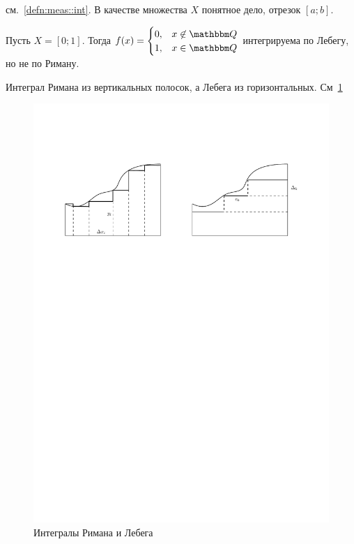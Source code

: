 \documentclass[draft, timbord]{longnotes}
\begin{document}
\begin{defn}\label{defn:meas::rimleb::leb}
  см.~\ref{defn:meas::int}. В качестве множества $X$ понятное дело, отрезок $[a;b]$.
\end{defn}

\begin{exmp}\label{exmp:meas::rimleb::notrim}
  Пусть $X=[0;1]$. Тогда $f(x) = \begin{cases}
    0, & x\not\in \Q \\
    1, & x\in \Q 
  \end{cases}$ интегрируема по Лебегу, но не по Риману.
\end{exmp}

Интеграл Римана из вертикальных полосок, а Лебега из горизонтальных.
См~\ref{fig:meas::rimleb} 

\begin{figure}
\begin{center}
  \includegraphics[scale=1]{meas/lebegriman}
\end{center}
\caption{Интегралы Римана и Лебега}
\label{fig:meas::rimleb}
\end{figure}
\end{document}
